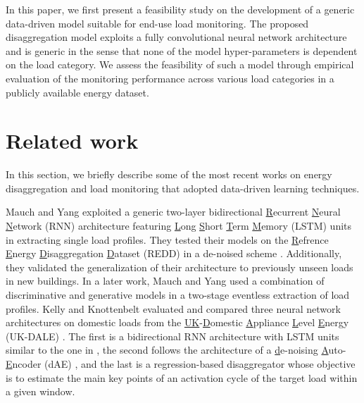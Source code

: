 \documentclass[twocolumn,letter,10pt]{IEEEtran} %
\begin{document}
In this paper, we first present a feasibility study on the development of a generic data-driven model suitable for end-use load monitoring. The proposed disaggregation model exploits a fully convolutional neural network architecture and is generic in the sense that none of the model hyper-parameters is dependent on the load category. We assess the feasibility of such a model through empirical evaluation of the monitoring performance across various load categories in a publicly available energy dataset.



\section{Related work}
\label{sec:related-work}

In this section, we briefly describe some of the most recent works on energy disaggregation and load monitoring that adopted data-driven learning techniques.

Mauch and Yang \cite{Mauch_2015} exploited a generic two-layer bidirectional \underline{R}ecurrent \underline{N}eural \underline{N}etwork (RNN) architecture featuring \underline{L}ong \underline{S}hort \underline{T}erm \underline{M}emory (LSTM) \cite{Hochreiter_1997_LSTM} units in extracting single load profiles. They tested their models on the \underline{R}efrence \underline{E}nergy \underline{D}isaggregation \underline{D}ataset (REDD) \cite{Kolter_2011_REDD} in a de-noised scheme \cite{Makonin_2015_NILMPerformanceEvaluation}. Additionally, they  validated the generalization of their architecture to previously unseen loads in new buildings. In a later work, Mauch and Yang \cite{Mauch_2016} used a combination of discriminative and generative models in a two-stage eventless extraction of load profiles. Kelly and Knottenbelt \cite{Kelly_2015} evaluated and compared three neural network architectures on domestic loads from the \underline{UK}-\underline{D}omestic \underline{A}ppliance \underline{L}evel \underline{E}nergy (UK-DALE) \cite{Kelly_2015_UKDALE}. The first is a bidirectional RNN architecture with LSTM units similar to the one in \cite{Mauch_2015}, the second follows the architecture of a \underline{d}e-noising \underline{A}uto-\underline{E}ncoder (dAE) \cite{Vincent_2010}, and the last is a regression-based disaggregator whose objective is to estimate the main key points of an activation cycle of the target load within a given window.
\end{document}

